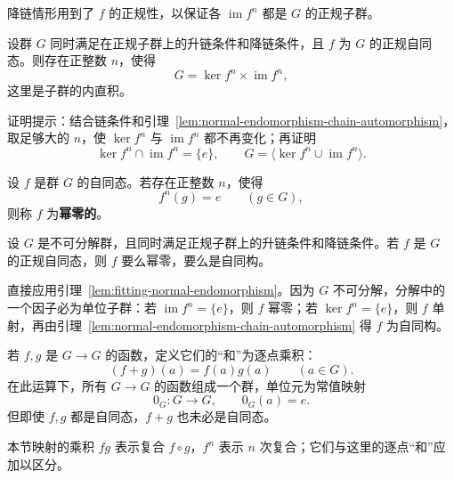 \begin{purplenote}
降链情形用到了 $f$ 的正规性，以保证各 $\operatorname{im}f^n$ 都是 $G$ 的正规子群。
\end{purplenote}

\begin{lemma}[Fitting]\label{lem:fitting-normal-endomorphism}
设群 $G$ 同时满足在正规子群上的升链条件和降链条件，且 $f$ 为 $G$ 的正规自同态。则存在正整数 $n$，使得
\[
  G=\ker f^n\times\operatorname{im}f^n,
\]
这里是子群的内直积。
\end{lemma}

\begin{purplenote}
证明提示：结合链条件和引理~\ref{lem:normal-endomorphism-chain-automorphism}，取足够大的 $n$，使 $\ker f^n$ 与 $\operatorname{im}f^n$ 都不再变化；再证明
\[
  \ker f^n\cap\operatorname{im}f^n=\{e\},
  \qquad
  G=\langle\ker f^n\cup\operatorname{im}f^n\rangle.
\]
\end{purplenote}

\begin{definition}[幂零自同态]\label{def:nilpotent-endomorphism}
设 $f$ 是群 $G$ 的自同态。若存在正整数 $n$，使得
\[
  f^n(g)=e\qquad(g\in G),
\]
则称 $f$ 为\textbf{幂零的}。
\end{definition}

\begin{corollary}\label{cor:indecomposable-normal-endomorphism-dichotomy}
设 $G$ 是不可分解群，且同时满足正规子群上的升链条件和降链条件。若 $f$ 是 $G$ 的正规自同态，则 $f$ 要么幂零，要么是自同构。
\end{corollary}

\begin{purpleproof}
直接应用引理~\ref{lem:fitting-normal-endomorphism}。因为 $G$ 不可分解，分解中的一个因子必为单位子群：若 $\operatorname{im}f^n=\{e\}$，则 $f$ 幂零；若 $\ker f^n=\{e\}$，则 $f$ 单射，再由引理~\ref{lem:normal-endomorphism-chain-automorphism} 得 $f$ 为自同构。
\end{purpleproof}

\begin{purplenote}
若 $f,g$ 是 $G\to G$ 的函数，定义它们的“和”为逐点乘积：
\[
  (f+g)(a)=f(a)g(a)\qquad(a\in G).
\]
在此运算下，所有 $G\to G$ 的函数组成一个群，单位元为常值映射
\[
  0_G:G\longrightarrow G,\qquad 0_G(a)=e.
\]
但即使 $f,g$ 都是自同态，$f+g$ 也未必是自同态。

本节映射的乘积 $fg$ 表示复合 $f\circ g$，$f^n$ 表示 $n$ 次复合；它们与这里的逐点“和”应加以区分。
\end{purplenote}

